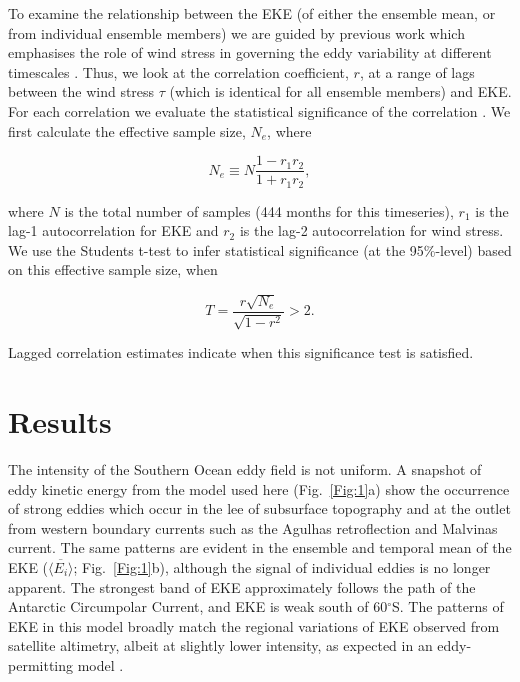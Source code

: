 \documentclass[linenumbers]{agujournal2019}
\begin{document}
To examine the relationship between the EKE (of either the ensemble mean, or from individual ensemble members) we are guided by previous work which emphasises the role of wind stress in governing the eddy variability at different timescales \citep[e.g.][]{Hogg2015, Sinha2016}.
Thus, we look at the correlation coefficient, $r$, at a range of lags between the wind stress $\tau$ (which is identical for all ensemble members) and EKE.
For each correlation we evaluate the statistical significance of the correlation \citep[following, e.g.][]{Santer2000}.
We first calculate the effective sample size, $N_e$, where
\begin{linenomath*}
\begin{equation}
N_e \equiv N \frac{1-r_1 r_2}{1+r_1 r_2},
\end{equation}
\end{linenomath*}
where $N$ is the total number of samples (444 months for this timeseries), $r_1$ is the lag-1 autocorrelation for EKE and $r_2$ is the lag-2 autocorrelation for wind stress.
We use the Students t-test to infer statistical significance (at the 95\%-level) based on this effective sample size, when
\begin{linenomath*}
\begin{equation}
T = \frac{r \sqrt{N_e}}{\sqrt{1-r^2}} > 2.
\end{equation}
\end{linenomath*}
Lagged correlation estimates indicate when this significance test is satisfied.

\section{Results}

The intensity of the Southern Ocean eddy field is not uniform.
A snapshot of eddy kinetic energy from the model used here (Fig.~\ref{Fig:1}a) show the occurrence of strong eddies which occur in the lee of subsurface topography and at the outlet from western boundary currents such as the Agulhas retroflection and Malvinas current.
The same patterns are evident in the ensemble and temporal mean of the EKE ($\overline{\langle E_i \rangle}$; Fig.~\ref{Fig:1}b), although the signal of individual eddies is no longer apparent.
The strongest band of EKE approximately follows the path of the Antarctic Circumpolar Current, and EKE is weak south of 60$^\circ$S.
The patterns of EKE in this model broadly match the regional variations of EKE observed from satellite altimetry, albeit at slightly lower intensity, as expected in an eddy-permitting model \citep[e.g.][]{Kiss2020}.
\end{document}
